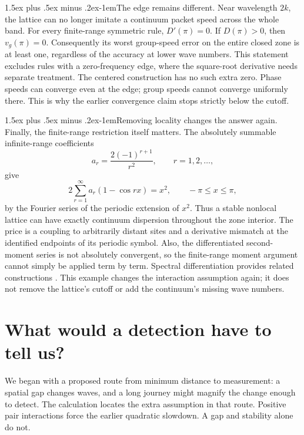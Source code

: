 \documentclass[11pt]{article}
\makeatletter
\renewcommand\paragraph{\@startsection{paragraph}{4}{\z@}
 {1.5ex plus .5ex minus .2ex}{-1em}{\normalfont\normalsize\bfseries}}
\makeatother
\begin{document}
\paragraph{The edge remains different.}
Near wavelength $2k$, the lattice can no longer imitate a continuum packet speed across the whole band. For every finite-range symmetric rule, $D'(\pi)=0$. If $D(\pi)>0$, then $v_g(\pi)=0$. Consequently its worst group-speed error on the entire closed zone is at least one, regardless of the accuracy at lower wave numbers. This statement excludes rules with a zero-frequency edge, where the square-root derivative needs separate treatment. The centered construction has no such extra zero. Phase speeds can converge even at the edge; group speeds cannot converge uniformly there. This is why the earlier convergence claim stops strictly below the cutoff.

\paragraph{Removing locality changes the answer again.}
Finally, the finite-range restriction itself matters. The absolutely summable infinite-range coefficients
\begin{equation}
 a_r=\frac{2(-1)^{r+1}}{r^2},\qquad r=1,2,\ldots,
\end{equation}
give
\begin{equation}
 2\sum_{r=1}^{\infty}a_r(1-\cos rx)=x^2,
 \qquad -\pi\leq x\leq\pi,
\end{equation}
by the Fourier series of the periodic extension of $x^2$. Thus a stable nonlocal lattice can have exactly continuum dispersion throughout the zone interior. The price is a coupling to arbitrarily distant sites and a derivative mismatch at the identified endpoints of its periodic symbol. Also, the differentiated second-moment series is not absolutely convergent, so the finite-range moment argument cannot simply be applied term by term. Spectral differentiation provides related constructions \cite{trefethen}. This example changes the interaction assumption again; it does not remove the lattice's cutoff or add the continuum's missing wave numbers.

\section{What would a detection have to tell us?}
We began with a proposed route from minimum distance to measurement: a spatial gap changes waves, and a long journey might magnify the change enough to detect. The calculation locates the extra assumption in that route. Positive pair interactions force the earlier quadratic slowdown. A gap and stability alone do not.
\end{document}

